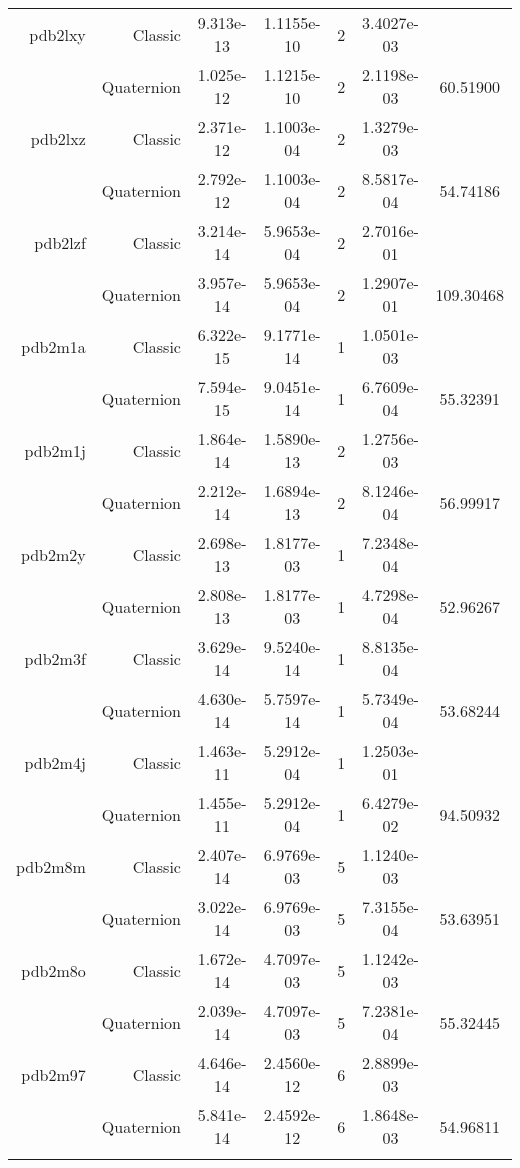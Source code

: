 \begin{xltabular}{\textwidth}{r|rS[table-format=1.3e+2]S[table-format=1.4e+2]cS[table-format=1.4e+2]S[table-format=-1.5]}
pdb2lxy & Classic & 9.313e-13 & 1.1155e-10 & 2 & 3.4027e-03 & \\
& Quaternion & 1.025e-12 & 1.1215e-10 & 2 & 2.1198e-03 & 60.51900\\  \addlinespace
pdb2lxz & Classic & 2.371e-12 & 1.1003e-04 & 2 & 1.3279e-03 & \\
& Quaternion & 2.792e-12 & 1.1003e-04 & 2 & 8.5817e-04 & 54.74186\\  \addlinespace
pdb2lzf & Classic & 3.214e-14 & 5.9653e-04 & 2 & 2.7016e-01 & \\
& Quaternion & 3.957e-14 & 5.9653e-04 & 2 & 1.2907e-01 & 109.30468\\  \addlinespace
pdb2m1a & Classic & 6.322e-15 & 9.1771e-14 & 1 & 1.0501e-03 & \\
& Quaternion & 7.594e-15 & 9.0451e-14 & 1 & 6.7609e-04 & 55.32391\\  \addlinespace
pdb2m1j & Classic & 1.864e-14 & 1.5890e-13 & 2 & 1.2756e-03 & \\
& Quaternion & 2.212e-14 & 1.6894e-13 & 2 & 8.1246e-04 & 56.99917\\  \addlinespace
pdb2m2y & Classic & 2.698e-13 & 1.8177e-03 & 1 & 7.2348e-04 & \\
& Quaternion & 2.808e-13 & 1.8177e-03 & 1 & 4.7298e-04 & 52.96267\\  \addlinespace
pdb2m3f & Classic & 3.629e-14 & 9.5240e-14 & 1 & 8.8135e-04 & \\
& Quaternion & 4.630e-14 & 5.7597e-14 & 1 & 5.7349e-04 & 53.68244\\  \addlinespace
pdb2m4j & Classic & 1.463e-11 & 5.2912e-04 & 1 & 1.2503e-01 & \\
& Quaternion & 1.455e-11 & 5.2912e-04 & 1 & 6.4279e-02 & 94.50932\\  \addlinespace
pdb2m8m & Classic & 2.407e-14 & 6.9769e-03 & 5 & 1.1240e-03 & \\
& Quaternion & 3.022e-14 & 6.9769e-03 & 5 & 7.3155e-04 & 53.63951\\  \addlinespace
pdb2m8o & Classic & 1.672e-14 & 4.7097e-03 & 5 & 1.1242e-03 & \\
& Quaternion & 2.039e-14 & 4.7097e-03 & 5 & 7.2381e-04 & 55.32445\\  \addlinespace
pdb2m97 & Classic & 4.646e-14 & 2.4560e-12 & 6 & 2.8899e-03 & \\
& Quaternion & 5.841e-14 & 2.4592e-12 & 6 & 1.8648e-03 & 54.96811\\  \addlinespace

\end{xltabular}
